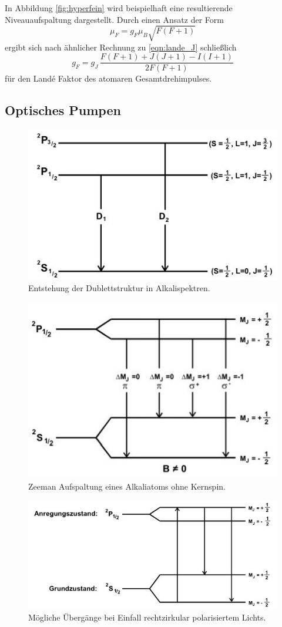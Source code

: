 In Abbildung \ref{fig:hyperfein} wird beispielhaft eine resultierende Niveauaufspaltung dargestellt. Durch einen Ansatz der Form
\begin{equation*}
	\mu_F = g_F \mu_B \sqrt{F(F + 1)}
\end{equation*}
ergibt sich nach ähnlicher Rechnung zu \eqref{eqn:lande_J} schließlich
\begin{equation}
	g_F = g_J \,\frac{F (F + 1) + J(J + 1) - I(I + 1)}{2 F (F + 1)}
	\label{eqn:lande_F}
\end{equation}
für den Landé Faktor des atomaren Gesamtdrehimpulses.

\subsection{Optisches Pumpen}

\begin{figure}[H]
	\centering
	\includegraphics[width=0.5\linewidth]{content/grafik/duplett.jpg}
	\caption{Entstehung der Dublettstruktur in Alkalispektren. \cite{pumpen}}
	\label{fig:duplett}
\end{figure}

\begin{figure}[H]
	\centering
	\includegraphics[width=0.55\linewidth]{content/grafik/zeeman.jpg}
	\caption{Zeeman Aufspaltung eines Alkaliatoms ohne Kernspin. \cite{pumpen}}
	\label{fig:zeeman}
\end{figure}

\begin{figure}[H]
	\centering
	\includegraphics[width=0.65\linewidth]{content/grafik/pumpen.jpg}
	\caption{Mögliche Übergänge bei Einfall rechtzirkular polarisiertem Lichts. \cite{pumpen}}
	\label{fig:pumpen}
\end{figure}

